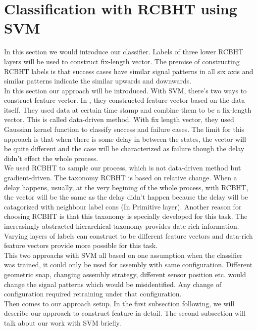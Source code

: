 %

\chapter{Classification with RCBHT using SVM}
In this section we would introduce our classifier. Labels of three lower RCBHT layers will be used to construct fix-length vector. The premise of constructing RCBHT labels is that success cases have similar signal patterns in all six axis and similar patterns indicate the similar upwards and downwards. \\
\indent In this section our approach will be introduced. With SVM, there's two ways to construct feature vector. In \cite{masonfailure}, they constructed feature vector based on the data itself. They used data at certain time stamp and combine them to be a fix-length vector. This is called data-driven method. With fix length vector, they used Gaussian kernel function to classify success and failure cases. The limit for this approach is that when there is some delay in between the states, the vector will be quite different and the case will be characterized as failure though the delay didn't effect the whole process. \\
\indent We used RCBHT to sample our process, which is not data-driven method but gradient-driven. The taxonomy RCBHT is based on relative change. When a delay happens, usually, at the very begining of the whole process, with RCBHT, the vector will be the same as the delay didn't happen because the delay will be catagorized with neighbour label cons (In Primitive layer). Another reason for choosing RCBHT is that this taxonomy is specially developed for this task. The increasingly abstracted hierarchical taxonomy provides date-rich information. Varying layers of labels can construct to be different feature vectors and data-rich feature vectors provide more possible for this task.\\ 
\indent This two approachs with SVM all based on one assumption when the classifier was trained, it could only be used for assembly with same configuration. Different geometric snap, changing assembly strategy, different sensor position etc. would change the signal patterns which would be misidentified. Any change of configuration required retraining under that configuration. \\
\indent Then comes to our approach setup. In the first subsection following, we will describe our approach to construct feature in detail. The second subsection will talk about our work with SVM briefly. 
